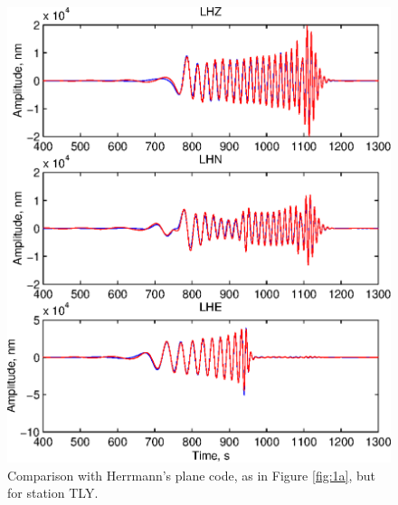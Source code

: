 \begin{figure}
\begin{center}
\includegraphics[width=5 in]{Figures/Fig2a}
\caption{Comparison with Herrmann's plane code, as in Figure \ref{fig:1a}, but for 
station TLY.} 
\label{fig:2a}
\end{center}
\end{figure}
